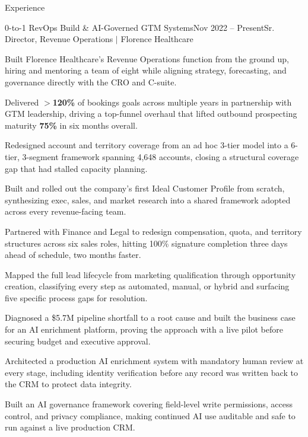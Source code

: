 \documentclass{resume}
\begin{document}
\begin{rSection}{Experience}

\begin{rSubsection}{0-to-1 RevOps Build \& AI-Governed GTM Systems}{\textcolor{black!60}{Nov 2022 -- Present}}{Sr. Director, Revenue Operations $\vert$ Florence Healthcare}{}
\item Built Florence Healthcare's Revenue Operations function from the ground up, hiring and mentoring a team of eight while aligning strategy, forecasting, and governance directly with the CRO and C-suite.
\item Delivered \textbf{$>$120\%} of bookings goals across multiple years in partnership with GTM leadership, driving a top-funnel overhaul that lifted outbound prospecting maturity \textbf{75\%} in six months overall.
\item Redesigned account and territory coverage from an ad hoc 3-tier model into a 6-tier, 3-segment framework spanning 4,648 accounts, closing a structural coverage gap that had stalled capacity planning.
\item Built and rolled out the company's first Ideal Customer Profile from scratch, synthesizing exec, sales, and market research into a shared framework adopted across every revenue-facing team.
\item Partnered with Finance and Legal to redesign compensation, quota, and territory structures across six sales roles, hitting 100\% signature completion three days ahead of schedule, two months faster.
\item Mapped the full lead lifecycle from marketing qualification through opportunity creation, classifying every step as automated, manual, or hybrid and surfacing five specific process gaps for resolution.
\item Diagnosed a \$5.7M pipeline shortfall to a root cause and built the business case for an AI enrichment platform, proving the approach with a live pilot before securing budget and executive approval.
\item Architected a production AI enrichment system with mandatory human review at every stage, including identity verification before any record was written back to the CRM to protect data integrity.
\item Built an AI governance framework covering field-level write permissions, access control, and privacy compliance, making continued AI use auditable and safe to run against a live production CRM.

\end{rSubsection}
\end{rSection}
\end{document}

